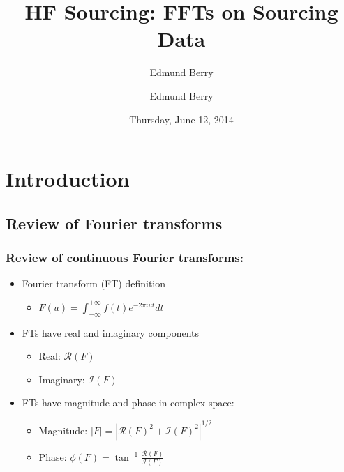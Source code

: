 \documentclass[bigger]{beamer}
\institute[Brown University]{\inst{1} Brown University}
\title{HF Sourcing: \newline FFTs on Sourcing Data}
\author{Edmund Berry}
\date{Thursday, June 12, 2014}
\author[Edmund Berry]{\alert{Edmund Berry}\inst{1}}
\begin{document}
\maketitle


\section{Introduction}
\label{sec-1}
\subsection{Review of Fourier transforms}
\label{sec-1-1}
\begin{frame}
\frametitle{Review of continuous Fourier transforms:}
\label{sec-1-1-1}
\begin{itemize}

\item Fourier transform (FT) definition
\label{sec-1-1-1-1}%
\begin{itemize}

\item \(F(u) = \int_{-\infty}^{+\infty}f(t)e^{-2\pi i u t} dt\)
\label{sec-1-1-1-1-1}%
\end{itemize} %

\item FTs have real and imaginary components
\label{sec-1-1-1-2}%
\begin{itemize}

\item Real: \(\mathcal{R}(F)\)
\label{sec-1-1-1-2-1}%

\item Imaginary: \(\mathcal{I}(F)\)
\label{sec-1-1-1-2-2}%
\end{itemize} %

\item FTs have magnitude and phase in complex space:
\label{sec-1-1-1-3}%
\begin{itemize}

\item Magnitude: \(|F| = |\mathcal{R}(F)^{2} + \mathcal{I}(F)^{2}|^{1/2}\)
\label{sec-1-1-1-3-1}%

\item Phase: \(\phi(F) = \tan^{-1}\frac{\mathcal{R}(F)}{\mathcal{I}(F)}\)
\label{sec-1-1-1-3-2}%
\end{itemize} %
\end{itemize} %
\end{frame}
\end{document}
